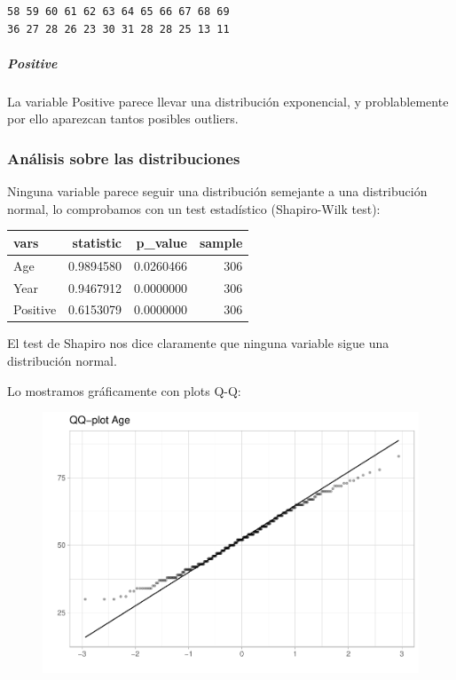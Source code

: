 \begin{verbatim}
58 59 60 61 62 63 64 65 66 67 68 69 
36 27 28 26 23 30 31 28 28 25 13 11 
\end{verbatim}


\subparagraph{Positive}

La variable Positive parece llevar una distribución exponencial, y problablemente por ello aparezcan tantos posibles outliers.


\subsubsection{Análisis sobre las distribuciones}

Ninguna variable parece seguir una distribución semejante a una distribución normal, lo comprobamos con un test estadístico (Shapiro-Wilk test):

\begin{tabular}{l|r|r|r}
\hline
vars & statistic & p\_value & sample\\
\hline
Age & 0.9894580 & 0.0260466 & 306\\
\hline
Year & 0.9467912 & 0.0000000 & 306\\
\hline
Positive & 0.6153079 & 0.0000000 & 306\\
\hline
\end{tabular}

El test de Shapiro nos dice claramente que ninguna variable sigue una distribución normal.

Lo mostramos gráficamente con plots Q-Q:

\begin{figure}[H]\includegraphics[width=.9\linewidth]{img/EDA2_files/figure-latex/unnamed-chunk-18-1} \end{figure}


